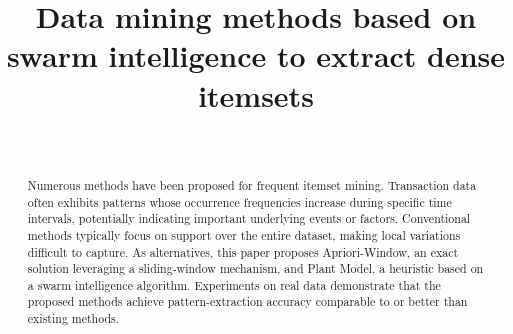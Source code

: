 \documentclass[conference]{IEEEtran}
\begin{document}
\title{Data mining methods based on swarm intelligence to extract dense itemsets
}


\author{
  \\
}




\maketitle

\begin{abstract}

Numerous methods have been proposed for frequent itemset mining. Transaction data often exhibits patterns whose occurrence frequencies increase during specific time intervals, potentially indicating important underlying events or factors. Conventional methods typically focus on support over the entire dataset, making local variations difficult to capture. As alternatives, this paper proposes Apriori-Window, an exact solution leveraging a sliding-window mechanism, and Plant Model, a heuristic based on a swarm intelligence algorithm. Experiments on real data demonstrate that the proposed methods achieve pattern-extraction accuracy comparable to or better than existing methods.
\end{abstract}
\end{document}
